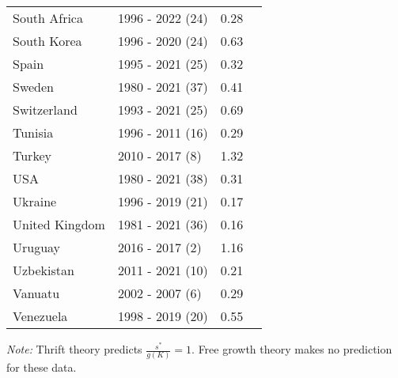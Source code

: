 \begin{table}[pos=h]
{{\begin{tabular}{llrr}
South Africa & 1996 - 2022 (24) & 0.28\\
South Korea & 1996 - 2020 (24) & 0.63\\
Spain & 1995 - 2021 (25) & 0.32\\
\addlinespace
Sweden & 1980 - 2021 (37) & 0.41\\
Switzerland & 1993 - 2021 (25) & 0.69\\
Tunisia & 1996 - 2011 (16) & 0.29\\
Turkey & 2010 - 2017 (8) & 1.32\\
USA & 1980 - 2021 (38) & 0.31\\
\addlinespace
Ukraine & 1996 - 2019 (21) & 0.17\\
United Kingdom & 1981 - 2021 (36) & 0.16\\
Uruguay & 2016 - 2017 (2) & 1.16\\
Uzbekistan & 2011 - 2021 (10) & 0.21\\
Vanuatu & 2002 - 2007 (6) & 0.29\\
\addlinespace
Venezuela & 1998 - 2019 (20) & 0.55\\ \end{tabular}

}
}
\bottomrule
\begin{flushleft}
\footnotesize \emph{Note:} Thrift theory predicts \(\frac{s^*}{g(K)} = 1\). Free growth theory makes no prediction for these data.
\end{flushleft}
\end{table}